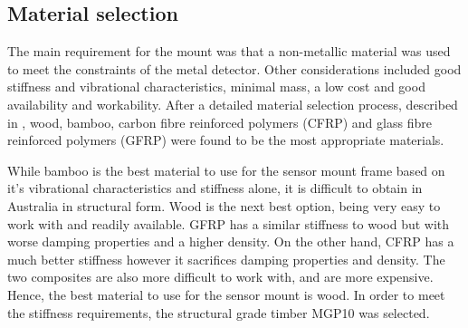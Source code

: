 \documentclass[main.tex]{subfiles}
\begin{document}
\subsection {Material selection}  
The main requirement for the mount was that a non-metallic material was used to meet the constraints of the metal detector. Other considerations included good stiffness and vibrational characteristics, minimal mass, a low cost and good availability and workability. After a detailed material selection process, described in , wood, bamboo, carbon fibre reinforced polymers (CFRP) and glass fibre reinforced polymers (GFRP) were found to be the most appropriate materials. 

While bamboo is the best material to use for the sensor mount frame based on it's vibrational characteristics and stiffness alone, it is difficult to obtain in Australia in structural form. Wood is the next best option, being very easy to work with and readily available. GFRP has a similar stiffness to wood but with worse damping properties and a higher density. On the other hand, CFRP has a much better stiffness however it sacrifices damping properties and density. The two composites are also more difficult to work with, and are more expensive. Hence, the best material to use for the sensor mount is wood. In order to meet the stiffness requirements, the structural grade timber MGP10 was selected. 
 
%
%
\end{document}
